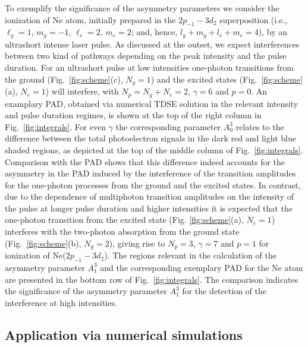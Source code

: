 To exemplify the significance of the asymmetry parameters we consider the ionization of Ne atom, initially prepared in the $2p_{-1}-3d_2$ superposition (i.e., $\ell_g = 1$, $m_g = -1$, $\ell_e = 2$, $m_e = 2$; and, hence, $l_g + m_g + l_e + m_e = 4$), by an ultrashort intense laser pulse. As discussed at the outset, we expect interferences between two kind of pathways depending on the peak intensity and the pulse duration. 
For an ultrashort pulse at low intensities one-photon transitions from the ground (Fig.\ \ref{fig:scheme}(c), $N_g = 1$) and the excited states (Fig.\ \ref{fig:scheme}(a), $N_e = 1$) will interfere, with $N_p = N_g + N_e = 2$, $\gamma = 6$ and $p=0$. An examplary PAD, obtained via numerical TDSE solution in the relevant intensity and pulse duration regimes, is shown at the top of the right column in Fig.~\ref{fig:integrals}. For even $\gamma$ the corresponding parameter $A_0^3$ relates to the difference between the total photoelectron signals in the dark red and light blue shaded regions, as depicted at the top of the middle column of Fig.~\ref{fig:integrals}. Comparison with the PAD shows that this difference indeed accounts for the asymmetry in the PAD induced by the interference of the transition amplitudes for the one-photon processes from the ground and the excited states. In contrast, due to the dependence of multiphoton transition amplitudes on the intensity of the pulse at longer pulse duration and higher intensities it is expected that the one-photon transition from the excited state (Fig. \ref{fig:scheme}(a), $N_e = 1$) interferes with the two-photon absorption from the ground state (Fig.\ \ref{fig:scheme}(b), $N_g = 2$), giving rise to $N_p = 3$, $\gamma = 7$ and $p=1$ for ionization of Ne($2p_{-1}-3d_2$). The regions relevant in the calculation of the asymmetry parameter $A_1^3$ and the corresponding exemplary PAD for the Ne atom are presented in the bottom row of Fig.~\ref{fig:integrals}. The comparison indicates the significance of the asymmetry parameter $A_1^3$ for the detection of the interference at high intensities.

\subsection*{Application via numerical simulations}

